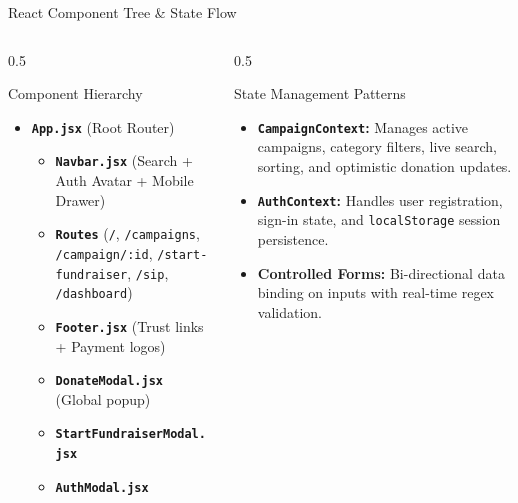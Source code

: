 \documentclass[aspectratio=169, 10pt]{beamer}
\begin{document}
\begin{frame}{React Component Tree \& State Flow}
  \begin{columns}[T]
    \begin{column}{0.5\textwidth}
      \begin{block}{Component Hierarchy}
        \begin{itemize}
          \item \textbf{\texttt{App.jsx}} (Root Router)
            \begin{itemize}
              \item \textbf{\texttt{Navbar.jsx}} (Search + Auth Avatar + Mobile Drawer)
              \item \textbf{\texttt{Routes}} (\texttt{/}, \texttt{/campaigns}, \texttt{/campaign/:id}, \texttt{/start-fundraiser}, \texttt{/sip}, \texttt{/dashboard})
              \item \textbf{\texttt{Footer.jsx}} (Trust links + Payment logos)
              \item \textbf{\texttt{DonateModal.jsx}} (Global popup)
              \item \textbf{\texttt{StartFundraiserModal.jsx}}
              \item \textbf{\texttt{AuthModal.jsx}}
            \end{itemize}
        \end{itemize}
      \end{block}
    \end{column}
    \begin{column}{0.5\textwidth}
      \begin{exampleblock}{State Management Patterns}
        \begin{itemize}
          \item \textbf{\texttt{CampaignContext}:} Manages active campaigns, category filters, live search, sorting, and optimistic donation updates.
          \item \textbf{\texttt{AuthContext}:} Handles user registration, sign-in state, and \texttt{localStorage} session persistence.
          \item \textbf{Controlled Forms:} Bi-directional data binding on inputs with real-time regex validation.
        \end{itemize}
      \end{exampleblock}
    \end{column}
  \end{columns}
\end{frame}
\end{document}
